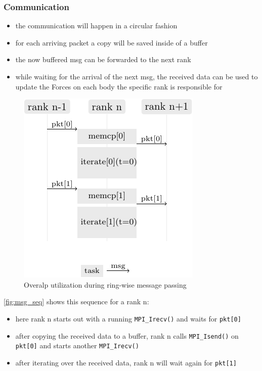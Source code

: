 \documentclass[]{scrartcl}
\begin{document}
\subsubsection{Communication}
\begin{itemize}
  \item the communication will happen in  a circular fashion
  \item for each arriving packet a copy will be saved inside of a buffer
  \item the now buffered msg can be forwarded to the next rank
  \item while waiting for the arrival of the next msg, the received data can be used to update the Forces on each body the specific rank is responsible for
\end{itemize}

\begin{figure}[H]
  \centering
  \includegraphics[width=.6\columnwidth]{./img/msg_seq.pdf}
  \caption{Overalp utilization during ring-wise message passing}
  \label{fig:msg_seq}
\end{figure}

\autoref{fig:msg_seq} shows this sequence for a rank n:
\begin{itemize}
  \item here rank n starts out with a running \verb|MPI_Irecv()| and waits for \verb|pkt[0]|
  \item after copying the received data to a buffer, rank n calls \verb|MPI_Isend()| on \verb|pkt[0]| and starts another \verb|MPI_Irecv()|
  \item after iterating over the received data, rank n will wait again for \verb|pkt[1]|
\end{itemize}
\end{document}
